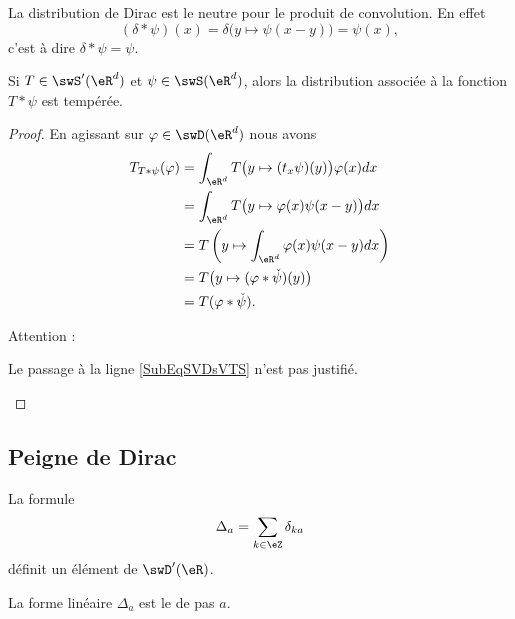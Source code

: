 \begin{example}
    La distribution de Dirac est le neutre pour le produit de convolution. En effet
    \begin{equation}
        (\delta*\psi)(x)=\delta\big( y\mapsto\psi(x-y) \big)=\psi(x),
    \end{equation}
    c'est à dire \( \delta*\psi=\psi\).
\end{example}

\begin{proposition} \label{PropZMKYMKI}
    Si \( T\in\swS'(\eR^d)\) et \( \psi\in\swS(\eR^d)\), alors la distribution associée à la fonction \( T*\psi\) est tempérée.
\end{proposition}

\begin{proof}
    En agissant sur \( \varphi\in\swD(\eR^d)\) nous avons
    \begin{subequations}
        \begin{align}
            T_{T*\psi}(\varphi)&=\int_{\eR^d}T\big( y\mapsto (t_x\psi)(y) \big)\varphi(x)dx\\
            &=\int_{\eR^d}T\big( y\mapsto \varphi(x)\psi(x-y) \big)dx\\
            &=T\left( y\mapsto\int_{\eR^d}\varphi(x)\psi(x-y)dx \right)     \label{SubEqSVDsVTS}\\
            &=T\big(y\mapsto (\varphi*\check\psi)(y)\big)\\
            &=T(\varphi*\check\psi).
        \end{align}
    \end{subequations}

    Attention :
    \begin{probleme}
        Le passage à la ligne \eqref{SubEqSVDsVTS} n'est pas justifié.
    \end{probleme}

\end{proof}

\subsection{Peigne de Dirac}

\begin{proposition}
    La formule
    \begin{equation}    \label{EqMEVmKvg}
        \Delta_a=\sum_{k\in \eZ}\delta_{ka}
    \end{equation}
    définit un élément de \( \swD'(\eR)\).
\end{proposition}
La forme linéaire \( \Delta_a\) est le  de pas \( a\).

